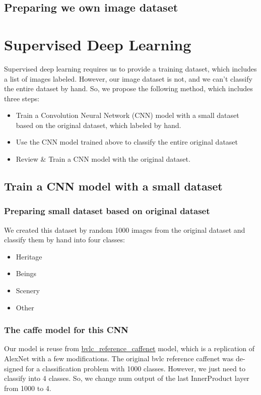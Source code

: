 \documentclass[11pt]{article}
\begin{document}
\subsection{Preparing we own image dataset}

\section{Supervised Deep Learning}
Supervised deep learning requires us to provide a training dataset, which includes a list of images labeled. However, our image dataset is not, and we can't classify the entire dataset by hand. So, we propose the following method, which includes three steps:
\begin{itemize}
\item Train a Convolution Neural Network (CNN) model with a small dataset based on the original dataset, which labeled by hand.
\item Use the CNN model trained above to classify the entire original dataset
\item Review \& Train a CNN model with the original dataset.
\end{itemize}

\subsection{Train a CNN model with a small dataset}

\subsubsection{Preparing small dataset based on original dataset}
We created this dataset by random 1000 images from the original dataset and classify them by hand into four classes: 
\begin{itemize}
\item Heritage
\item Beings
\item Scenery
\item Other
\end{itemize}
\subsubsection{The caffe model for this CNN}
Our model is reuse from \href{https://github.com/BVLC/caffe/tree/master/models/bvlc\_reference\_caffenet}{bvlc\_reference\_caffenet} model, which is a replication of AlexNet with a few modifications. The original bvlc reference caffenet was de-
signed for a classification problem with 1000 classes. However, we just need to classify into 4 classes. So, we change num output of the last
InnerProduct layer from 1000 to 4.
\end{document}
